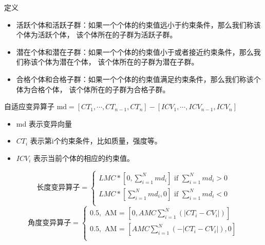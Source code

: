 \documentclass{beamer}
\begin{document}
\begin{frame}{定义}
		\begin{itemize}
			\item
				活跃个体和活跃子群：如果一个个体的约束值远小于约束条件，那么我们称该个体为活跃个体，
				该个体所在的子群为活跃子群。
			\item
				潜在个体和潜在子群：如果一个个体的约束值小于或者接近约束条件，那么我们称该个体为潜在个体，
				该个体所在的子群为潜在子群。
			\item
				合格个体和合格子群：如果一个个体的约束值满足约束条件，那么我们称该个体为合格个体，
				该个体所在的子群为合格子群。
		\end{itemize}
\end{frame}




\begin{frame}{自适应变异算子}
		$\text{md} = [CT_1, \cdots, CT_{n-1}, CT_n] -  [ICV_1, \cdots, ICV_{n-1},
		ICV_n]$ \\
		\begin{itemize}
			\item  md 表示变异向量 
			\item  $CT_i$ 表示第i个约束条件，比如质量，强度等。
			\item  $ICV_i$ 表示当前个体的相应的约束值。
		\end{itemize}

		\begin{equation}
			\text{长度变异算子} =  
			\left\{
				\begin{array}{l}
					  LMC*[0, \sum_{i=1}^{N}{md_i}]  \text{ if $\sum_{i=1}^{N}{md_i} > 0$} \\
					  LMC*[\sum_{i=1}^{N}{md_i}, 0]  \text{ if $\sum_{i=1}^{N}{md_i} < 0$} \\
				  \end{array} 
				  \right.
		\end{equation}
		\begin{equation}
			\text{角度变异算子} = 
				\left\{
					\begin{array}{l}
					0.5, \text{ AM = }[0,AMC \sum_{i=1}^{N}{(|CT_i-CV_i|)}] \\ 
					0.5, \text{ AM = }[ AMC \sum_{i=1}^{N}{(-|CT_i-CV_i|)},0] \\
					\end{array}
					\right.
		\end{equation}
\end{frame}
\end{document}
